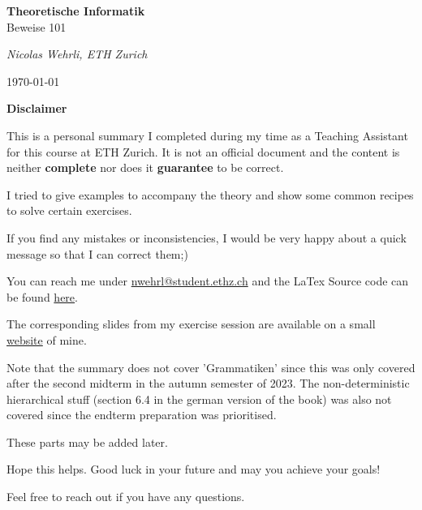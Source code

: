 \documentclass[a4paper, 11pt]{article}
\begin{document}
   \begin{titlepage}
    \begin{center}
        \vspace*{5cm}
        \LARGE \textbf{Theoretische Informatik} \\ Beweise 101
    
        \small\textit{Nicolas Wehrli, ETH Zurich}

        \vspace*{5cm}
        \today
    \end{center}
   
   \end{titlepage}

   {\LARGE\textbf{Disclaimer}}

   This is a personal summary I completed during my time as a Teaching Assistant 
   for this course at ETH Zurich. It is not an official document and the content 
   is neither \textbf{complete} nor does it \textbf{guarantee} to be correct.

   I tried to give examples to accompany the theory and show some common recipes to solve certain exercises. 
   
   If you find any mistakes or inconsistencies, I would be very happy about a quick message so that I can correct them;)

   You can reach me under \href{mailto: nwehrl@student.ethz.ch}{nwehrl@student.ethz.ch} 
   and the LaTex Source code can be found \href{https://github.com/nwehrli/Theoretische-Informatik}{here}.

   The corresponding slides from my exercise session are available on a small \href{https://n.ethz.ch/~nwehrl/TheoInf}{website} of mine.
   
   Note that the summary does not cover 'Grammatiken' since this was only covered 
   after the second midterm in the autumn semester of 2023. 
   The non-deterministic hierarchical stuff (section 6.4 in the german version of the book) 
   was also not covered since the endterm preparation was prioritised.

   These parts may be added later.
   

   Hope this helps. Good luck in your future and may you achieve your goals!

   Feel free to reach out if you have any questions.
   \newpage

   \tableofcontents
    \newpage
   
   
   
   
   
   
   
\end{document}
